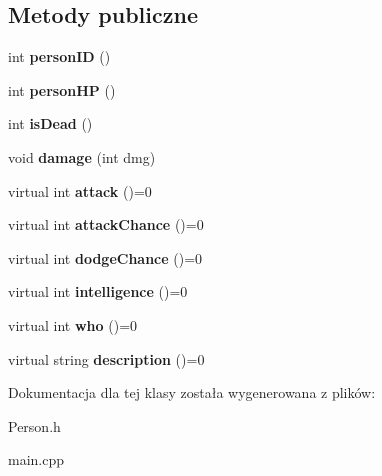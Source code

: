 \subsection*{Metody publiczne}
\begin{DoxyCompactItemize}
\item 
int {\bfseries person\+ID} ()\hypertarget{classPerson_a4ea656fa93595281740221a37e223044}{}\label{classPerson_a4ea656fa93595281740221a37e223044}

\item 
int {\bfseries person\+HP} ()\hypertarget{classPerson_a3054b34b9ecdc924630f54f6a8b7bc02}{}\label{classPerson_a3054b34b9ecdc924630f54f6a8b7bc02}

\item 
int {\bfseries is\+Dead} ()\hypertarget{classPerson_a4d88afde6fa07378dbdb18eb50ab9e64}{}\label{classPerson_a4d88afde6fa07378dbdb18eb50ab9e64}

\item 
void {\bfseries damage} (int dmg)\hypertarget{classPerson_a5dbdaa48f3456c30c792fb40cf16b9eb}{}\label{classPerson_a5dbdaa48f3456c30c792fb40cf16b9eb}

\item 
virtual int {\bfseries attack} ()=0\hypertarget{classPerson_a7cabe13a0c3122fa7ac0e9f005a87346}{}\label{classPerson_a7cabe13a0c3122fa7ac0e9f005a87346}

\item 
virtual int {\bfseries attack\+Chance} ()=0\hypertarget{classPerson_a4f525256f6ffb3135e61bd22ff48c37a}{}\label{classPerson_a4f525256f6ffb3135e61bd22ff48c37a}

\item 
virtual int {\bfseries dodge\+Chance} ()=0\hypertarget{classPerson_adb64abc2cc5e02f1ebbc7823e7921168}{}\label{classPerson_adb64abc2cc5e02f1ebbc7823e7921168}

\item 
virtual int {\bfseries intelligence} ()=0\hypertarget{classPerson_a3d18aad60b7ea1305e1a469d7d5fc216}{}\label{classPerson_a3d18aad60b7ea1305e1a469d7d5fc216}

\item 
virtual int {\bfseries who} ()=0\hypertarget{classPerson_a7d102d6c8ed786f4ad1fcd2c3cea2f3e}{}\label{classPerson_a7d102d6c8ed786f4ad1fcd2c3cea2f3e}

\item 
virtual string {\bfseries description} ()=0\hypertarget{classPerson_aef5de94dd30ff791097a0c1444999e60}{}\label{classPerson_aef5de94dd30ff791097a0c1444999e60}

\end{DoxyCompactItemize}


Dokumentacja dla tej klasy została wygenerowana z plików\+:\begin{DoxyCompactItemize}
\item 
Person.\+h\item 
main.\+cpp\end{DoxyCompactItemize}
